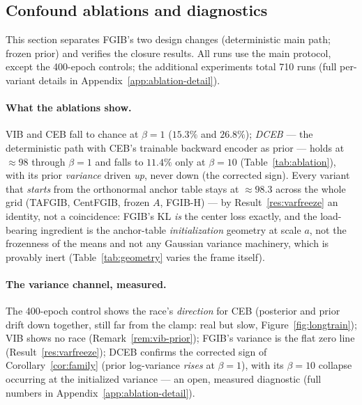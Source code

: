 \documentclass{article} %
\begin{document}
\subsection{Confound ablations and diagnostics}
\label{sec:ablation}

This section separates FGIB's two design changes (deterministic main path; frozen
prior) and verifies the closure results. All runs use the main protocol, except the
400-epoch controls; the additional experiments total 710 runs (full per-variant details
in Appendix~\ref{app:ablation-detail}).

\paragraph{What the ablations show.}
VIB and CEB fall to chance at $\beta=1$ ($15.3\%$ and $26.8\%$); \emph{DCEB} --- the
deterministic path with CEB's trainable backward encoder as prior --- holds at
$\approx 98$ through $\beta=1$ and falls to $11.4\%$ only at $\beta=10$
(Table~\ref{tab:ablation}), with its prior \emph{variance} driven \emph{up}, never
down (the corrected sign). Every variant that \emph{starts} from the orthonormal
anchor table stays at $\approx 98.3$ across the whole grid (TAFGIB, CentFGIB, frozen
$A$, FGIB-H) --- by Result~\ref{res:varfreeze} an identity, not a coincidence: FGIB's
KL \emph{is} the center loss exactly, and the load-bearing ingredient is the
anchor-table \emph{initialization} geometry at scale $a$, not the frozenness of the
means and not any Gaussian variance machinery, which is provably inert
(Table~\ref{tab:geometry} varies the frame itself).

\paragraph{The variance channel, measured.}
The 400-epoch control shows the race's \emph{direction} for CEB (posterior and prior
drift down together, still far from the clamp: real but slow,
Figure~\ref{fig:longtrain}); VIB shows no race (Remark~\ref{rem:vib-prior}); FGIB's
variance is the flat zero line (Result~\ref{res:varfreeze}); DCEB confirms the
corrected sign of Corollary~\ref{cor:family} (prior log-variance \emph{rises} at
$\beta=1$), with its $\beta=10$ collapse occurring at the initialized variance --- an
open, measured diagnostic (full numbers in Appendix~\ref{app:ablation-detail}).
\end{document}
